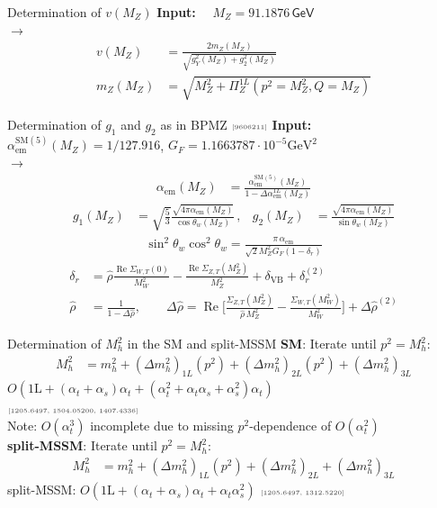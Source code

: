 \documentclass[hyperref={pdfpagelabels=false},ngerman]{beamer}
\newcommand{\eh}[1]{\,\mathsf{#1}}
\newcommand{\mycite}[1]{\ensuremath{\text{\textcolor{darkgray}{\tiny [#1]}}}}
\DeclareMathOperator{\re}{Re}
\renewcommand{\emph}{\textbf}
\newcommand{\SM}{\ensuremath{\text{SM}}}
\newcommand{\at}{\alpha_t}
\newcommand{\as}{\alpha_s}
\newcommand{\aem}{\alpha_\text{em}}
\begin{document}
\begin{frame}[noframenumbering]{Determination of $v(M_Z)$}
  \emph{Input:} \ \ $M_Z = 91.1876\eh{GeV}$\\[1em]
  $\rightarrow$
  \begin{align*}
    v(M_Z) &= \frac{2 m_Z(M_Z)}{\sqrt{g_Y^2(M_Z) + g_2^2(M_Z)}} \\
    m_Z(M_Z) &= \sqrt{M_Z^2 + \Pi_Z^{1L}(p^2=M_Z^2,Q=M_Z)}
  \end{align*}
\end{frame}

\begin{frame}[noframenumbering]{Determination of $g_1$ and $g_2$ as in BPMZ \mycite{9606211}}
  \emph{Input:} \ \ $\aem^{\SM(5)}(M_Z) = 1/127.916$, $G_F = 1.1663787\cdot 10^{-5}\text{GeV}^2$\\[1em]
  $\rightarrow$
  \begin{align*}
  \aem(M_Z) &=
  \frac{\aem^{\SM(5)}(M_Z)}{1 - \Delta\aem^{1L}(M_Z)} 
  \end{align*}
  \begin{align*}
    g_1(M_Z) &= \sqrt{\frac{5}{3}} \frac{\sqrt{4\pi\aem(M_Z)}}{\cos\theta_w(M_Z)} \,, &
    g_2(M_Z) &= \frac{\sqrt{4\pi\aem(M_Z)}}{\sin\theta_w(M_Z)}
  \end{align*}
  \begin{align*}
  \sin^2\theta_w \cos^2\theta_w =
  \frac{\pi\,\aem}{\sqrt{2} M_Z^2 G_F (1-\delta_r)}
  \end{align*}
  \begin{align*}
    \delta_r &= \hat\rho \frac{\re\Sigma_{W,T}(0)}{M_W^2} -
    \frac{\re\Sigma_{Z,T}(M_Z^2)}{M_Z^2} + \delta_{\text{VB}} + \delta_r^{(2)} \\
    \hat\rho &= \frac{1}{1-\Delta\hat\rho} , \qquad \Delta\hat\rho
    = \re\Biggl[ \frac{\Sigma_{Z,T}(M_Z^2)}{\hat\rho\,M_Z^2} -
    \frac{\Sigma_{W,T}(M_W^2)}{M_W^2}\Biggr] + \Delta\hat\rho^{(2)}
  \end{align*}
\end{frame}

\begin{frame}[noframenumbering]{Determination of $M_h^2$ in the SM and split-MSSM}
  \emph{SM}:
  Iterate until $p^2 = M_h^2$:
  \begin{align*}
    M_h^2 &= m_h^2 + (\Delta m_h^2)_{1L}(p^2)
            + (\Delta m_h^2)_{2L}(p^2) +(\Delta m_h^2)_{3L}
  \end{align*}
  $O(\text{1L} + (\at+\as)\at + (\at^2 + \at\as + \as^2)\at)$\\
  \mycite{1205.6497, 1504.05200, 1407.4336}\\
  Note: $O(\at^3)$ incomplete due to missing $p^2$-dependence of $O(\at^2)$
  \\[2em]
  \emph{split-MSSM}:
  Iterate until $p^2 = M_h^2$:
  \begin{align*}
    M_h^2 &= m_h^2 + (\Delta m_h^2)_{1L}(p^2)
            + (\Delta m_h^2)_{2L} +(\Delta m_h^2)_{3L}
  \end{align*}
  split-MSSM: $O(\text{1L} + (\at+\as)\at + \at\as^2)$
  \mycite{1205.6497, 1312.5220}
\end{frame}
\end{document}
